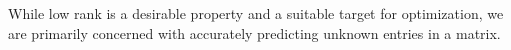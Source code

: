 \documentclass{article} %
\begin{document}








While low rank is a desirable property and a suitable target for
optimization, we are primarily concerned with accurately predicting
unknown entries in a matrix. 
\end{document}
